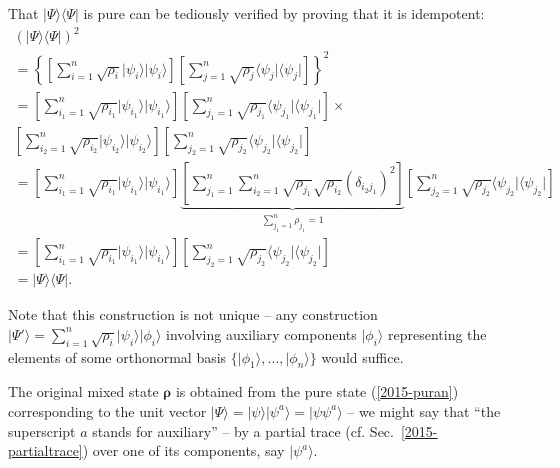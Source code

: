 {%
That $\vert \Psi\rangle \langle \Psi \vert$ is pure can be tediously verified by proving that it is idempotent:
\begin{equation}
\begin{split}
(\vert \Psi\rangle \langle \Psi \vert )^2
\\=
\left\{
\left[\sum_{i=1}^n \sqrt{\rho_i}  \vert \psi_i\rangle  \vert \psi_i\rangle \right]
\left[\sum_{j=1}^n \sqrt{\rho_j}  \langle  \psi_j\vert \langle \psi_j\vert \right]
\right\}^2
\\=
\left[\sum_{i_1=1}^n \sqrt{\rho_{i_1}}  \vert \psi_{i_1}\rangle  \vert \psi_{i_1}\rangle \right]
\left[\sum_{j_1=1}^n \sqrt{\rho_{j_1}}  \langle  \psi_{j_1}\vert \langle \psi_{j_1}\vert \right]\times \\
\left[\sum_{i_2=1}^n \sqrt{\rho_{i_2}}  \vert \psi_{i_2}\rangle  \vert \psi_{i_2}\rangle \right]
\left[\sum_{j_2=1}^n \sqrt{\rho_{j_2}}  \langle  \psi_{j_2}\vert \langle \psi_{j_2}\vert \right]
\qquad
\\=
\left[\sum_{i_1=1}^n \sqrt{\rho_{i_1}}  \vert \psi_{i_1}\rangle  \vert \psi_{i_1}\rangle \right]
\underbrace{
\left[\sum_{j_1=1}^n \sum_{i_2=1}^n \sqrt{\rho_{j_1}}\sqrt{\rho_{i_2}}  (\delta_{i_2 j_1})^2 \right]
}_
{
 \sum_{j_1=1}^n   \rho_{j_1} = 1
}
\left[\sum_{j_2=1}^n \sqrt{\rho_{j_2}}  \langle  \psi_{j_2}\vert \langle \psi_{j_2}\vert \right]
\\=
\left[\sum_{i_1=1}^n \sqrt{\rho_{i_1}}  \vert \psi_{i_1}\rangle  \vert \psi_{i_1}\rangle \right]
\left[\sum_{j_2=1}^n \sqrt{\rho_{j_2}}  \langle  \psi_{j_2}\vert \langle \psi_{j_2}\vert \right]
\\=  \vert \Psi\rangle \langle \Psi \vert
.
\label{2015-puranproof}
\end{split}
\end{equation}
}

Note that this construction is not unique -- any construction
$\vert \Psi' \rangle = \sum_{i=1}^n \sqrt{\rho_i}  \vert \psi_i\rangle  \vert \phi_i\rangle$
involving auxiliary components
$\vert \phi_i\rangle$
representing the elements of some orthonormal basis $\{\vert \phi_1\rangle , \ldots , \vert \phi_n\rangle \}$
would suffice.

The original mixed state ${\boldsymbol{\rho}}$ is obtained from the pure state (\ref{2015-puran})
corresponding to the unit vector $\vert \Psi\rangle = \vert \psi \rangle \vert \psi^a \rangle  = \vert \psi \psi^a \rangle$
-- we might say that ``the superscript $a$ stands for auxiliary'' --
by a partial trace (cf. Sec.~\ref{2015-partialtrace}) over one of its components, say  $\vert \psi^a\rangle$.

